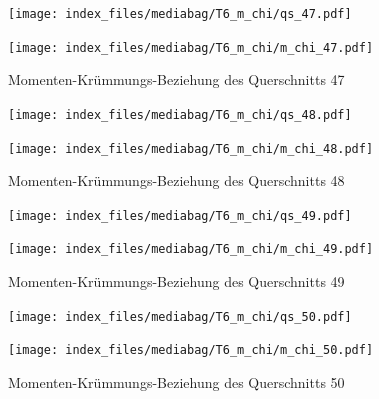 \documentclass[
  11pt,
  letterpaper,
]{scrreprt}
\begin{document}
\begin{figure}[H]

\begin{minipage}{0.50\linewidth}
\texttt{[image: index\_files/mediabag/T6\_m\_chi/qs\_47.pdf]}\end{minipage}%
%
\begin{minipage}{0.50\linewidth}
\texttt{[image: index\_files/mediabag/T6\_m\_chi/m\_chi\_47.pdf]}\end{minipage}%

\caption{\label{fig-m_chi_appendix}Momenten-Krümmungs-Beziehung des
Querschnitts 47}

\end{figure}%

\begin{figure}[H]

\begin{minipage}{0.50\linewidth}
\texttt{[image: index\_files/mediabag/T6\_m\_chi/qs\_48.pdf]}\end{minipage}%
%
\begin{minipage}{0.50\linewidth}
\texttt{[image: index\_files/mediabag/T6\_m\_chi/m\_chi\_48.pdf]}\end{minipage}%

\caption{\label{fig-m_chi_appendix}Momenten-Krümmungs-Beziehung des
Querschnitts 48}

\end{figure}%

\begin{figure}[H]

\begin{minipage}{0.50\linewidth}
\texttt{[image: index\_files/mediabag/T6\_m\_chi/qs\_49.pdf]}\end{minipage}%
%
\begin{minipage}{0.50\linewidth}
\texttt{[image: index\_files/mediabag/T6\_m\_chi/m\_chi\_49.pdf]}\end{minipage}%

\caption{\label{fig-m_chi_appendix}Momenten-Krümmungs-Beziehung des
Querschnitts 49}

\end{figure}%

\begin{figure}[H]

\begin{minipage}{0.50\linewidth}
\texttt{[image: index\_files/mediabag/T6\_m\_chi/qs\_50.pdf]}\end{minipage}%
%
\begin{minipage}{0.50\linewidth}
\texttt{[image: index\_files/mediabag/T6\_m\_chi/m\_chi\_50.pdf]}\end{minipage}%

\caption{\label{fig-m_chi_appendix}Momenten-Krümmungs-Beziehung des
Querschnitts 50}

\end{figure}%
\end{document}
